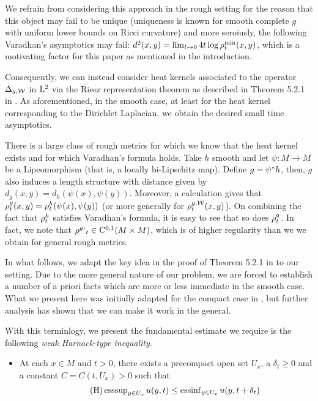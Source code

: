 \documentclass[a4paper, 12pt]{amsart}
\begin{document}
We refrain from considering this approach in the rough setting 
for the reason that this object may fail to be unique (uniqueness
is known for smooth complete $g$ with 
uniform lower bounds on Ricci curvature) and more seroiusly, the following
Varadhan's asymptotics may fail: 
$d^2(x,y) = \lim_{t \to 0} 4t \log \rho^{\min}_t(x,y)$,
which is a motivating factor for this paper as mentioned in the 
introduction.

Consequently, we can instead consider heat kernels
associated to the operator $\Delta_{g,\mathcal{W}}$ in ${\rm L}^{2}_{\rm {}}$
via the Riesz representation theorem as described in Theorem 
5.2.1 in \cite{Davies}. As aforementioned, in the smooth case,
at least for the heat kernel corresponding to the 
Dirichlet Laplacian, we obtain the desired small time
asymptotics. 

There is a large class of rough metrics
for which we know that the heat kernel exists
and for which Varadhan's formula holds. 
Take $h$ smooth and let $\psi:M \to M$
be a Lipeomorphism (that is, a locally bi-Lipschitz map).
Define $g = {\psi}^\ast h$, then, $g$ 
also induces a length structure with 
distance given by $d_g(x,y) = d_h(\psi(x), \psi(y))$.
Moreover, a calculation gives
that $\rho^{g}_t(x,y) = \rho^{h}_t(\psi(x), \psi(y))$
(or more generally for $\rho^{g,\mathcal{W}}_t(x,y)$). 
On combining the fact that $\rho^h_t$ satisfies
Varadhan's formula, it is easy to see that
so does $\rho^{g}_t$. In fact, we 
note that $\rho^g`_t \in {\rm C}^{0,1}_{\rm {}}(M \times M)$,
which is of higher regularity than we we
obtain for general rough metrics.

In what follows, we adapt the key idea in 
the proof of Theorem 5.2.1 in \cite{Davies}
to our setting. Due to the more general 
nature of our problem, we are forced to 
establish a number of a priori facts which 
are more or less immediate in the smooth case.
What we present here was initially adapted for the
compact case in \cite{BRough}, but further analysis
has shown that we can make it work in the general.

With this terminlogy, we present the fundamental estimate we
require is the following \emph{weak Harnack-type inequality}.
\begin{itemize}
\item[] At each $x \in M$ and $t > 0$, there exists a precompact
open set $U_x$, a $\delta_t \geq 0$ and a constant $C = C(t, U_x)  > 0$ such that
\begin{equation}
\tag{H}
\label{eq:Harnack}
\operatorname{esssup}_{y \in U_x} u(y,t) 
	\leq \operatorname{essinf}_{y \in U_x} u(y, t + \delta_t)
\end{equation}
\end{itemize}
\end{document}
